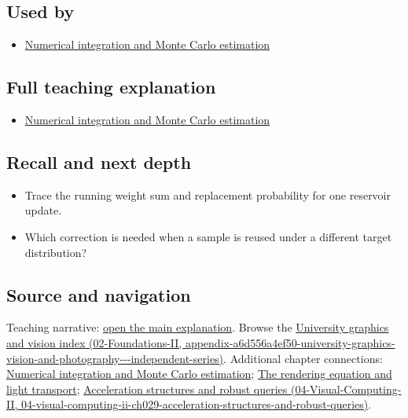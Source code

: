 \subsection{Used by}\label{appendix-68be451b78b1-used-by}

\begin{itemize}
\tightlist
\item
  \hyperref[03-visual-computing-i-ch012-numerical-integration-and-monte-carlo-estimation]{Numerical integration and Monte Carlo estimation}
\end{itemize}

\subsection{Full teaching explanation}\label{appendix-68be451b78b1-full-teaching-explanation}

\begin{itemize}
\tightlist
\item
  \hyperref[03-visual-computing-i-ch012-numerical-integration-and-monte-carlo-estimation]{Numerical integration and Monte Carlo estimation}
\end{itemize}

\subsection{Recall and next depth}\label{appendix-68be451b78b1-recall-and-next-depth}

\begin{itemize}
\tightlist
\item
  Trace the running weight sum and replacement probability for one reservoir update.
\item
  Which correction is needed when a sample is reused under a different target distribution?
\end{itemize}

\subsection{Source and navigation}\label{appendix-68be451b78b1-source-and-navigation}

Teaching narrative: \hyperref[03-visual-computing-i-ch012-numerical-integration-and-monte-carlo-estimation]{open the main explanation}. Browse the \href{../02-Foundations-II/main.pdf\#nameddest=appendix-a6d556a4ef50-university-graphics-vision-and-photography---independent-series}{University graphics and vision index (02-Foundations-II, appendix-a6d556a4ef50-university-graphics-vision-and-photography-\/-\/-independent-series)}. Additional chapter connections: \hyperref[03-visual-computing-i-ch012-numerical-integration-and-monte-carlo-estimation]{Numerical integration and Monte Carlo estimation}; \hyperref[03-visual-computing-i-ch007-the-rendering-equation-and-light-transport]{The rendering equation and light transport}; \href{../04-Visual-Computing-II/main.pdf\#nameddest=04-visual-computing-ii-ch029-acceleration-structures-and-robust-queries}{Acceleration structures and robust queries (04-Visual-Computing-II, 04-visual-computing-ii-ch029-acceleration-structures-and-robust-queries)}.

